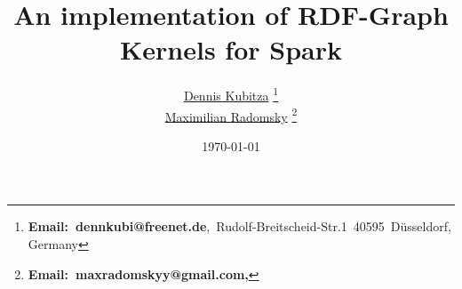 
\title{An implementation of RDF-Graph Kernels for Spark}

\author{
\href{https://github.com/DennisKubitza}{Dennis Kubitza} \thanks{\textbf{Email:\ denn\textunderscore kubi@freenet.de},\ Rudolf-Breitscheid-Str.1\ 40595\ D\"usseldorf, Germany} \\ \href{https://github.com/pelmeshk0}{Maximilian Radomsky} \thanks{\textbf{Email:\ maxradomskyy@gmail.com, }}}
\date{\today}

